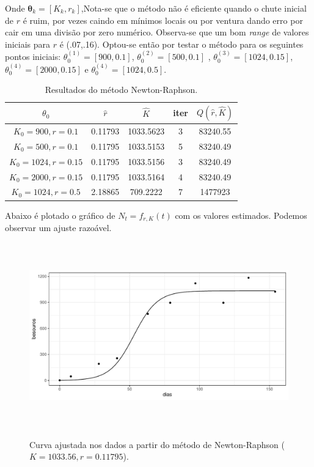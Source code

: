 \documentclass[a4paper,12pt,twoside]{article}
\begin{document}
Onde $\bm{\theta}_k=[K_{k},r_{k}]$,Nota-se que o método não é eficiente quando o chute inicial de $r$ é ruim, por vezes caindo em mínimos locais ou por ventura dando erro por cair em uma divisão por zero numérico. Observa-se que um bom \textit{range} de valores iniciais para $r$ é (.07,.16). Optou-se então por testar o método para os seguintes pontos iniciais: $\theta^{(1)}_{0}=[900,0.1]$, $\theta^{(2)}_{0}=[500,0.1]$ , $\theta^{(3)}_{0}=[1024,0.15]$, $\theta^{(4)}_{0}=[2000,0.15]$ e $\theta^{(4)}_{0}=[1024,0.5]$. 

\begin{table}[H]
\centering
\caption{Resultados do método Newton-Raphson.}
\begin{tabular}{ccccc}
\hline
$\theta_{0}$      & $\hat{r}$ & $\hat{K}$ & iter & $Q(\hat{r},\hat{K})$ \\ \hline
$K_0=900,r=0.1$   & 0.11793   & 1033.5623 & 3    & 83240.55             \\
$K_0=500,r=0.1$   & 0.11795   & 1033.5153 & 5    & 83240.49             \\
$K_0=1024,r=0.15$ & 0.11795   & 1033.5156 & 3    & 83240.49             \\
$K_0=2000,r=0.15$ & 0.11795   & 1033.5164 & 4    & 83240.49             \\
$K_0=1024,r=0.5$ & 2.18865   & 709.2222 & 7    & 1477923             \\ \hline
\end{tabular}
\end{table}

Abaixo é plotado o gráfico de $N_t=f_{r,K}(t)$ com os valores estimados. Podemos observar um ajuste razoável.

\begin{figure}[H]
  \centering
  {\includegraphics[width=16cm,height=8cm]{imgs/NR.pdf}}
  \captionsetup{font=footnotesize,width=15cm}
  \caption{\small Curva ajustada nos dados a partir do método de Newton-Raphson ($K=1033.56,r=0.11795$).}
\end{figure}
\end{document}
